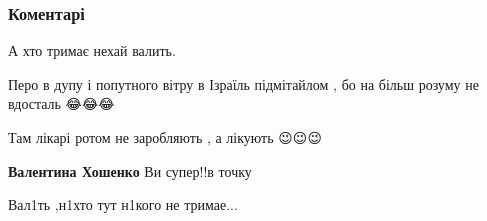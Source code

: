  
 
 
 
 
\subsubsection{Коментарі}
\label{sec:04_08_2021.fb.pravda_ljudmila.1.komarovskii_zakon_mova.cmt}

\begin{itemize}
 
А хто тримає нехай валить.

 

Перо в дупу і попутного вітру в Ізраїль підмітайлом , бо на більш розуму не
вдосталь 😂😂😂

Там лікарі ротом не заробляють , а лікують 😉😉😉

\begin{itemize}
 
\textbf{Валентина Хошенко} Ви супер!!в точку
\end{itemize}

 
Вал1ть ,н1хто тут н1кого не тримае...

 

\end{itemize}
